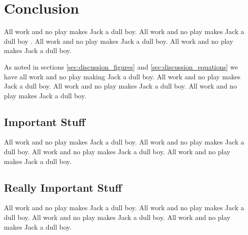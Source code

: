 
%
%

%
%

\section{Conclusion}
\label{sec:conclusion}

All work and no play makes Jack a dull boy.
All work and no play makes Jack a dull boy \cite{knuth-website}.
All work and no play makes Jack a dull boy.
All work and no play makes Jack a dull boy.

As noted in sections
\ref{sec:discussion_figures} and
\ref{sec:discussion_equations}
we have all work and no play making Jack a dull boy.
All work and no play makes Jack a dull boy.
All work and no play makes Jack a dull boy.
All work and no play makes Jack a dull boy.

\subsection{Important Stuff}
\label{sec:conclusions_important_stuff}

All work and no play makes Jack a dull boy.
All work and no play makes Jack a dull boy.
All work and no play makes Jack a dull boy.
All work and no play makes Jack a dull boy.

\subsection{Really Important Stuff}
\label{sec:conclusions_really_important_stuff}

All work and no play makes Jack a dull boy.
All work and no play makes Jack a dull boy.
All work and no play makes Jack a dull boy.
All work and no play makes Jack a dull boy.
